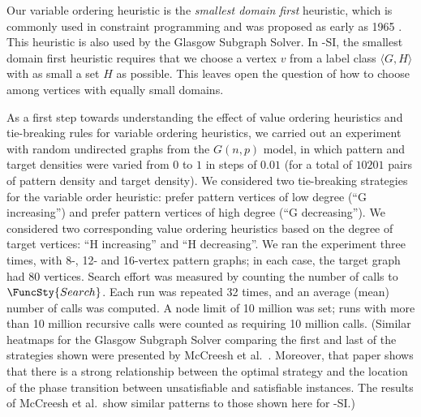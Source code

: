 Our variable ordering heuristic is the \emph{smallest domain first} heuristic,
which is commonly used in constraint programming and was proposed as early as
1965 \cite{golomb1965backtrack}.
This heuristic is also used by the Glasgow Subgraph Solver.
In \McSplit-SI, the smallest domain first heuristic requires
that we choose a vertex $v$ from a label class $\langle G, H \rangle$ with
as small a set $H$ as possible.  This leaves open the question of how
to choose among vertices with equally small domains.

As a first step towards understanding the effect of value ordering heuristics
and tie-breaking rules for variable ordering heuristics, we carried out an experiment
with random undirected graphs from the $G(n,p)$ model, in which pattern and target
densities were varied from $0$ to $1$ in steps of $0.01$ (for a total of $10201$
pairs of pattern density and target density).  We considered two tie-breaking
strategies for the variable order heuristic: prefer pattern vertices of low
degree (``G increasing'') and prefer pattern vertices of high degree (``G decreasing'').
We considered two corresponding value ordering heuristics based on the degree of target
vertices: ``H increasing'' and ``H decreasing''.  We ran the experiment three times,
with 8-, 12- and 16-vertex pattern graphs; in each case, the target graph had 80 vertices.
Search effort was measured by counting the number of calls to $\FuncSty{Search}$.
Each run was repeated 32 times, and an average (mean) number of calls was computed.
A node limit of 10 million was set; runs with more than 10 million recursive calls
were counted as requiring 10 million calls.
(Similar heatmaps for the Glasgow Subgraph Solver comparing the first and last of the strategies shown were
presented by McCreesh et al.\ \cite{DBLP:journals/jair/McCreeshPST18}.  Moreover,
that paper shows that there is a strong relationship between the optimal strategy
and the location of the phase transition between unsatisfiable and satisfiable
instances.
The results of McCreesh et al.\ show similar patterns to those shown here for \McSplit-SI.)

